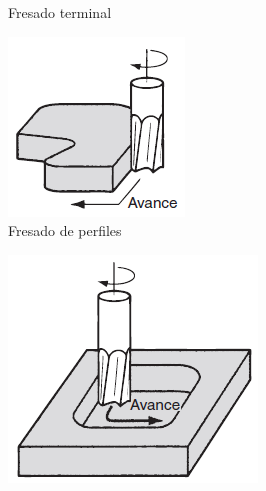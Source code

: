 \begin{figure}[hbt]
\begin{subfigure}{0.25\textwidth}
        \caption{Fresado terminal}
        \label{fig:FresadoT}
    \end{subfigure}
    \begin{subfigure}{0.25\textwidth}
        \centering
        \includegraphics[width=0.9\linewidth]{Cap1_FormulaciondelProyecto/Figuras/d.PNG}
        \caption{Fresado de perfiles}
        \label{fig:Fresadodeperfiles}
    \end{subfigure}
    \begin{subfigure}{0.25\textwidth}
        \centering
        \includegraphics[width=0.9\linewidth]{Cap1_FormulaciondelProyecto/Figuras/e.PNG}

\end{subfigure}
\end{figure}

